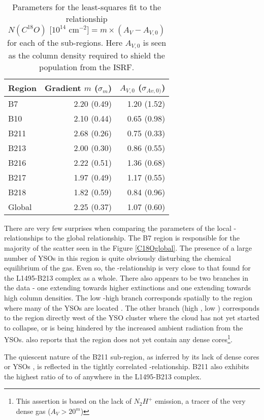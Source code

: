 \documentclass{aa}
\begin{document}
\begin{table}
\centering
\begin{tabular}{l|r|r}
Region & Gradient $m$ ($\sigma_m$) & $A_{V,0}$ ($\sigma_{Av,0)}$) \\
\hline
B7 & 2.20 (0.49) & 1.20 (1.52) \\
B10 & 2.10 (0.44) & 0.65 (0.98) \\
B211 & 2.68 (0.26) & 0.75 (0.33) \\
B213 & 2.00 (0.30) & 0.86 (0.55) \\
B216 & 2.22 (0.51) & 1.36 (0.68) \\
B217 & 1.97 (0.49) & 1.17 (0.55) \\
B218 & 1.82 (0.59) & 0.84 (0.96) \\
\hline
Global & 2.25 (0.37) & 1.07 (0.60)\\

\end{tabular}
\caption{Parameters for the least-squares fit to the relationship $$N(C^{18}O)\text{ [$10 ^{14}$ cm$^{-2}$]}=m\times (A_V - A_{V,0})$$ for each of the sub-regions. Here $A_{V,0}$ is seen as the \htwo column density required to shield the \eco population from the ISRF.}
\label{sub_region_pars}
\end{table}

There are very few surprises when comparing the parameters of the local \neco-\av relationships to the global relationship. The B7 region is responsible for the majority of the scatter seen in the Figure \ref{C18Oglobal}. The presence of a large number of YSOs in this region \citep{rebull10} is quite obviously disturbing the chemical equilibrium of the gas. Even so, the \neco-\av relationship is very close to that found for the L1495-B213 complex as a whole. There also appears to be two branches in the data - one extending towards higher extinctions and one extending towards high \eco column densities. The low \neco-high \av branch corresponds spatially to the region where many of the YSOs are located \citep{hacar13}. The other branch (high \neco, low \av) corresponds to the region directly west of the YSO cluster where the cloud has not yet started to collapse, or is being hindered by the increased ambient radiation from the YSOs. \citet{hacar13} also reports that the region does not yet contain any dense cores\footnote{This assertion is based on the lack of $N_2H^+$ emission, a tracer of the very dense gas ($A_V>20^m$)}.

The quiescent nature of the B211 sub-region, as inferred by its lack of dense cores or YSOs \citep{hacar13}, is reflected in the tightly correlated \neco-\av relationship. B211 also exhibits the highest ratio of \neco to \nhtwo of anywhere in the L1495-B213 complex.
\end{document}
